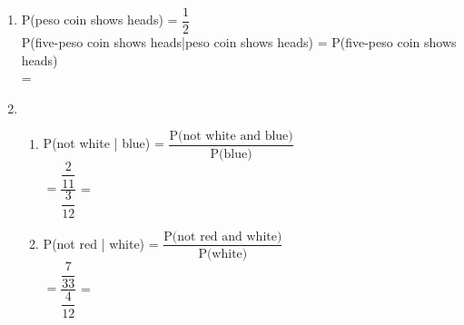 \begin{enumerate}[label = \arabic*. ]
\item %
P(peso coin shows heads) = $\dfrac{1}{2} $ \redcheck \\
P(five-peso coin shows heads|peso coin shows heads) = P(five-peso coin shows heads)  \redcheck \\
= \redcheck 
 
\item %
\begin{enumerate}[label = \alph*. ]
\item %
P(not white | blue) = $\dfrac{\text{P(not white and blue)}}{\text{P(blue)}} $ \redcheck \\
$ = \dfrac{\dfrac{2}{11}}{\dfrac{3}{12}} $ \redcheck %
= \redcheck 

\item %
P(not red | white) = $\dfrac{\text{P(not red and white)}}{\text{P(white)}} $ \redcheck \\
$ = \dfrac{\dfrac{7}{33}}{\dfrac{4}{12}} $ \redcheck %
= \redcheck 
 
\end{enumerate} 
 

\end{enumerate} 


